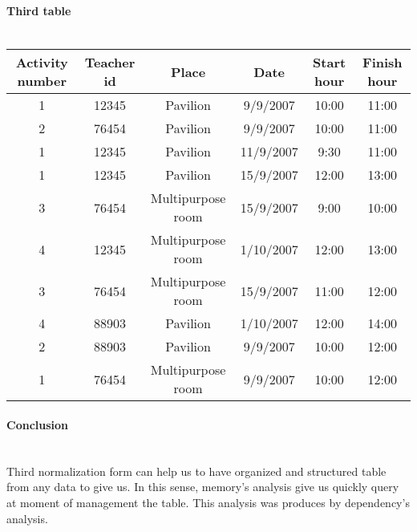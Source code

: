 \documentclass{article}
\begin{document}
\paragraph{Third table\\\\}
\begin{tabular}{|c|c|c|c|c|c|}
Activity number & Teacher id & Place & Date & Start hour & Finish hour\\
\hline
1 & 12345 & Pavilion & 9/9/2007 & 10:00 & 11:00\\
2 & 76454 & Pavilion & 9/9/2007 & 10:00 & 11:00\\
1 & 12345 & Pavilion & 11/9/2007 & 9:30 & 11:00\\
1 & 12345 & Pavilion & 15/9/2007 & 12:00 & 13:00\\
3 & 76454 & Multipurpose room & 15/9/2007 & 9:00 & 10:00\\
4 & 12345 & Multipurpose room & 1/10/2007 & 12:00 & 13:00\\
3 & 76454 & Multipurpose room & 15/9/2007 & 11:00 & 12:00\\
4 & 88903 & Pavilion & 1/10/2007 & 12:00 & 14:00\\
2 & 88903 & Pavilion & 9/9/2007 & 10:00 & 12:00\\
1 & 76454 & Multipurpose room & 9/9/2007 & 10:00 & 12:00\\
\end{tabular}
\paragraph{Conclusion\\\\}
Third normalization form can help us to have organized and structured table from any data to give us. In this sense, memory's analysis give us quickly query at moment of management the table. This analysis was produces by dependency's analysis.  
\end{document}
